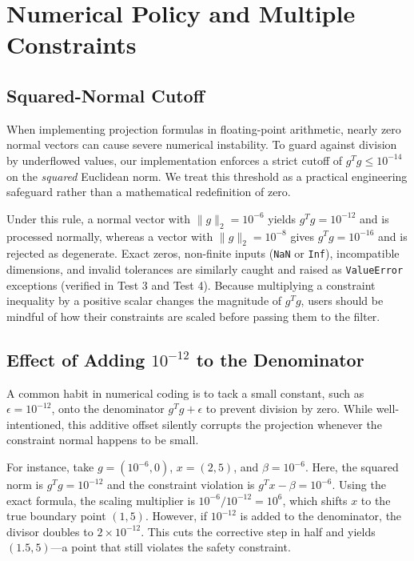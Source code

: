 \documentclass[11pt,a4paper]{article}
\begin{document}
\section{Numerical Policy and Multiple Constraints}

\subsection{Squared-Normal Cutoff}
When implementing projection formulas in floating-point arithmetic, nearly zero normal vectors can cause severe numerical instability. To guard against division by underflowed values, our implementation enforces a strict cutoff of $g^T g \le 10^{-14}$ on the \emph{squared} Euclidean norm. We treat this threshold as a practical engineering safeguard rather than a mathematical redefinition of zero.

Under this rule, a normal vector with $\|g\|_2 = 10^{-6}$ yields $g^T g = 10^{-12}$ and is processed normally, whereas a vector with $\|g\|_2 = 10^{-8}$ gives $g^T g = 10^{-16}$ and is rejected as degenerate. Exact zeros, non-finite inputs (\texttt{NaN} or \texttt{Inf}), incompatible dimensions, and invalid tolerances are similarly caught and raised as \texttt{ValueError} exceptions (verified in Test 3 and Test 4). Because multiplying a constraint inequality by a positive scalar changes the magnitude of $g^T g$, users should be mindful of how their constraints are scaled before passing them to the filter.

\subsection{\texorpdfstring{Effect of Adding $10^{-12}$ to the Denominator}{Effect of Adding 1e-12 to the Denominator}}
A common habit in numerical coding is to tack a small constant, such as $\epsilon = 10^{-12}$, onto the denominator $g^T g + \epsilon$ to prevent division by zero. While well-intentioned, this additive offset silently corrupts the projection whenever the constraint normal happens to be small.

For instance, take $g = (10^{-6}, 0)$, $x = (2, 5)$, and $\beta = 10^{-6}$. Here, the squared norm is $g^T g = 10^{-12}$ and the constraint violation is $g^T x - \beta = 10^{-6}$. Using the exact formula, the scaling multiplier is $10^{-6} / 10^{-12} = 10^6$, which shifts $x$ to the true boundary point $(1, 5)$. However, if $10^{-12}$ is added to the denominator, the divisor doubles to $2 \times 10^{-12}$. This cuts the corrective step in half and yields $(1.5, 5)$---a point that still violates the safety constraint.
\end{document}
